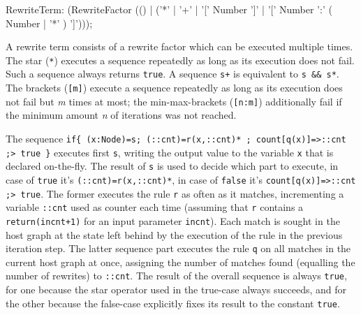 \begin{rail}
  RewriteTerm: 
    (RewriteFactor (() | ('*' | '+' | '[' Number ']' | '[' Number ':' ( Number | '*' ) ']')));
\end{rail}

A rewrite term consists of a rewrite factor which can be executed multiple times.
The star (\texttt{*}) executes a sequence repeatedly as long as its execution does not fail. 
Such a sequence always returns \texttt{true}.
A sequence \verb#s+# is equivalent to \verb#s && s*#.
The brackets (\texttt{[m]}) execute a sequence repeatedly as long as its execution does not fail but \emph{m} times at most;
the min-max-brackets (\texttt{[n:m]}) additionally fail if the minimum amount \emph{n} of iterations was not reached.

\begin{example}
The sequence \verb#if{ (x:Node)=s; (::cnt)=r(x,::cnt)* ; count[q(x)]=>::cnt ;> true }# 
executes first \texttt{s}, writing the output value to the variable \texttt{x} that is declared on-the-fly.
The result of \texttt{s} is used to decide which part to execute, in case of \texttt{true} it's \verb#(::cnt)=r(x,::cnt)*#,
in case of \texttt{false} it's \verb#count[q(x)]=>::cnt ;> true#.
The former executes the rule \texttt{r} as often as it matches, incrementing a variable \texttt{::cnt} used as counter each time (assuming that \texttt{r} contains a \verb#return(incnt+1)# for an input parameter \texttt{incnt}).
Each match is sought in the host graph at the state left behind by the execution of the rule in the previous iteration step.
The latter sequence part executes the rule \texttt{q} on all matches in the current host graph at once, assigning the number of matches found (equalling the number of rewrites) to \texttt{::cnt}.
The result of the overall sequence is always \texttt{true}, for one because the star operator used in the true-case always succeeds, and for the other because the false-case explicitly fixes its result to the constant \texttt{true}.
\end{example}


